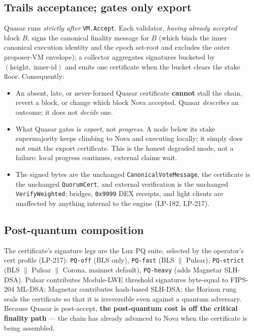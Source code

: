 \documentclass[11pt,a4paper]{article}
\begin{document}
\subsection{Trails acceptance; gates only export}

Quasar runs \emph{strictly after} \texttt{VM.Accept}. Each validator, \emph{having already
accepted} block \(B\), signs the canonical finality message for \(B\) (which binds the inner
canonical execution identity and the epoch set-root and excludes the outer proposer-VM
envelope); a collector aggregates signatures bucketed by \((\text{height},\ \text{inner-id})\)
and emits one certificate when the bucket clears the stake floor. Consequently:

\begin{itemize}[leftmargin=1.4em]
\item An absent, late, or never-formed Quasar certificate \textbf{cannot} stall the chain,
revert a block, or change which block Nova accepted. Quasar \emph{describes} an outcome; it
does not \emph{decide} one.
\item What Quasar gates is \emph{export}, not \emph{progress}. A node below its stake
supermajority keeps climbing to Nova and executing locally; it simply does not emit the
export certificate. This is the honest degraded mode, not a failure: local progress
continues, external claims wait.
\item The signed bytes are the unchanged \texttt{CanonicalVoteMessage}, the certificate is
the unchanged \texttt{QuorumCert}, and external verification is the unchanged
\texttt{VerifyWeighted}; bridges, \texttt{0x9999} DEX receipts, and light clients are
unaffected by anything internal to the engine (LP-182, LP-217).
\end{itemize}

\subsection{Post-quantum composition}

The certificate's signature legs are the Lux PQ suite, selected by the operator's cert
profile (LP-217): \texttt{PQ-off} (BLS only), \texttt{PQ-fast} (BLS \(\parallel\) Pulsar),
\texttt{PQ-strict} (BLS \(\parallel\) Pulsar \(\parallel\) Corona, mainnet default),
\texttt{PQ-heavy} (adds Magnetar SLH-DSA). Pulsar contributes Module-LWE threshold signatures
byte-equal to FIPS-204 ML-DSA; Magnetar contributes hash-based SLH-DSA; the Horizon rung
seals the certificate so that it is irreversible even against a quantum adversary. Because
Quasar is post-accept, \textbf{the post-quantum cost is off the critical finality path} --- the
chain has already advanced to Nova when the certificate is being assembled.
\end{document}
